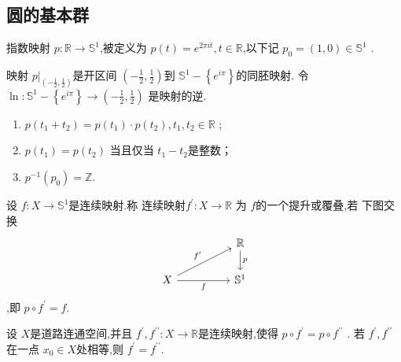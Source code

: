 \documentclass[../../几何与拓扑.tex]{subfiles}
\begin{document}
\subsection{圆的基本群}

\begin{definition}
    指数映射 \(  p: \mathbb{R} \to \mathbb{S}^{1}  \),被定义为 \(  p\left( t \right)= e^{2\pi it}, t \in \mathbb{R}    \),以下记 \(  p_0= \left( 1,0 \right) \in \mathbb{S}^{1}   \) .  

    映射 \(  p| _{\left( -\frac{1}{2},\frac{1}{2} \right) }  \)是开区间 \(  \left( -\frac{1}{2},\frac{1}{2} \right)   \)到 \(  \mathbb{S}^{1} -\left\{ e^{i\pi } \right\}  \)的同胚映射. 令 \(  \ln : \mathbb{S}^{1}- \left\{ e^{i\pi } \right\}\to  \left( -\frac{1}{2},\frac{1}{2} \right)   \)    是映射的逆.
\end{definition}
\begin{remark}
    \begin{enumerate}
        \item \(  p\left( t_1+ t_2 \right)=  p\left( t_1 \right)\cdot p\left( t_2 \right), t_1,t_2\in \mathbb{R}      \) ;
        \item \(  p\left( t_1 \right)= p\left( t_2 \right)    \) 当且仅当 \(  t_1-t_2  \)是整数；
        \item  \(  p ^{-1} \left( p_0 \right)= \mathbb{Z}   \).  
    \end{enumerate}
    
\end{remark}



\begin{definition}
    设 \(  f: X\to \mathbb{S}^{1}  \)是连续映射.称 连续映射\(  f^{\prime} : X \to \mathbb{R}   \)  为 \(  f  \)的一个提升或覆叠,若
    下图交换  
    \[\begin{tikzcd}
	&& {\mathbb{R}} \\
	X && {\mathbb{S}^1}
	\arrow["p", from=1-3, to=2-3]
	\arrow["{f^{\prime}}", from=2-1, to=1-3]
	\arrow["f"', from=2-1, to=2-3]
\end{tikzcd}\],即 \(  p\circ f^{\prime}  =  f  \). 
\end{definition}


\begin{lemma}
    设 \(  X  \)是道路连通空间,并且 \(  f^{\prime} ,f ^{\prime \prime} : X \to \mathbb{R}   \)是连续映射,使得 \(  p\circ f^{\prime}  =  p\circ f ^{\prime \prime}   \)   . 若 \(  f^{\prime} , f ^{\prime \prime}   \) 在一点 \(  x_0\in X  \)处相等,则 \(  f^{\prime}  =  f ^{\prime \prime}   \).  
\end{lemma}
\end{document}
